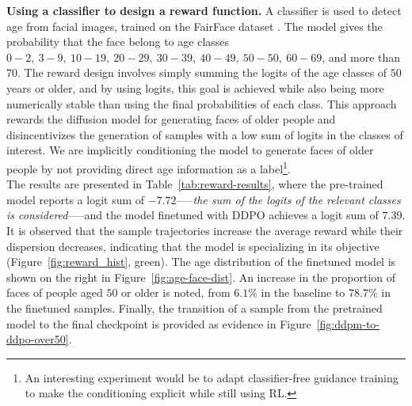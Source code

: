 \noindent \textbf{Using a classifier to design a reward function.} A classifier is used to detect age from
facial images, trained on the FairFace dataset \cite{vitage-classifier-hf, kärkkäinen2019fairfacefaceattributedataset}. The model gives the probability that the face belong to age classes $0-2,~3-9,~10-19,~20-29,~30-39,~40-49,~ 50-50,~60-69$, and more than $70$. The reward design involves simply summing the logits of the age classes of $50$ years or older, and by using 
logits, this goal is achieved while also being more numerically stable than using the final probabilities of each class. This approach rewards the diffusion
model for generating faces of older people and disincentivizes the generation of samples with a low sum of logits in the classes of interest. We are implicitly conditioning the model to generate faces of older people by not providing direct age information as a label\footnote{An interesting experiment would be to adapt classifier-free guidance training \cite{Ho2022ClassifierFreeDG} to make the conditioning explicit while still using RL.}. \\

\noindent The results are presented in Table~\ref{tab:reward-results}, where the pre-trained model reports a logit sum of $-7.72$—--\textit{the sum of the logits of the relevant classes is considered}--—and the model finetuned with DDPO achieves a logit sum of $7.39$. It is observed that the sample trajectories increase the average reward while their dispersion decreases, indicating that the model is specializing in its objective (Figure~\ref{fig:reward_hist}, green). The age distribution of the finetuned model is shown on the right in Figure~\ref{fig:age-face-dist}. An increase in the proportion of faces of people aged $50$ or older is noted, from $6.1\%$ in the baseline to $78.7\%$ in the finetuned samples. Finally, the transition of a sample from the pretrained model to the final checkpoint is provided as evidence in Figure~\ref{fig:ddpm-to-ddpo-over50}.\\

